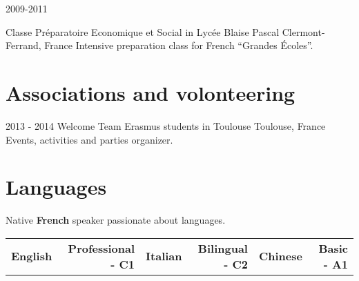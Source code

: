 \documentclass[]{cv}
\newcommand{\vcenteredinclude}[1]{\begingroup
\setbox0=\hbox{\texttt{[image: \#1]}}%
\parbox{\wd0}{\box0}\endgroup}
\begin{document}
\begin{entrylistlogodated}
\entrylogodated
    {2009-2011}
    {

    }
    {Classe Pr\'eparatoire Economique et Social in Lyc\'ee Blaise Pascal}
    {Clermont-Ferrand, France}
    {
      Intensive preparation class for French ``Grandes \'Ecoles''.
    }
\end{entrylistlogodated}

\section{Associations and volonteering}
\begin{entrylistlogodated}
  \entrydated
      {2013 - 2014}
      {Welcome Team Erasmus students in Toulouse}
      {Toulouse, France}
      {
        Events, activities and parties organizer.
      }
\end{entrylistlogodated}


\section{Languages}
Native \textbf{French} speaker passionate about languages.\\
\setlength{\tabcolsep}{5pt}
\begin{tabularx}{\textwidth}{X r | X r | X r}
  \textbf{English} & \textbf{\textcolor{airforceblue}{Professional - C1}}  & \textbf{Italian} & \textbf{\textcolor{airforceblue}{Bilingual - C2}} & \textbf{Chinese} & \textbf{\textcolor{airforceblue}{Basic - A1}} \tabularnewline
\end{tabularx}
\end{document}

